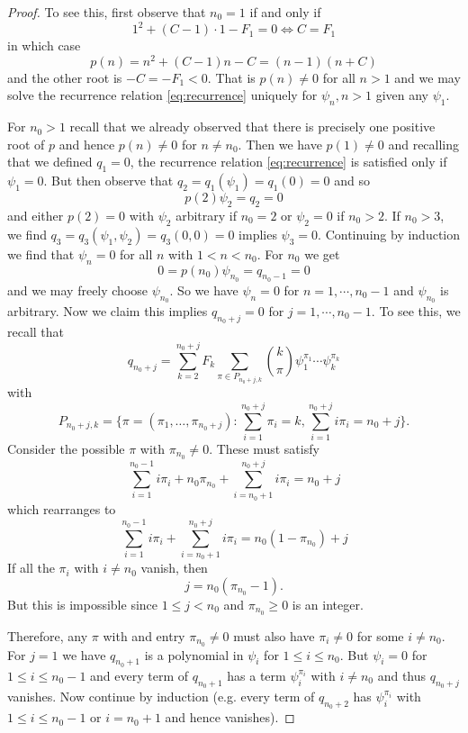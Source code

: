 \documentclass{amsart}
\begin{document}
\begin{proof}
To see this, first observe that \(n_0 = 1\) if and only if
\[
1^2 + (C - 1) \cdot 1 - F_1 = 0 \Leftrightarrow C = F_1
\]
in which case
\[
p(n) = n^2 + (C - 1) n - C = (n-1)(n + C)
\]
and the other root is \(-C = -F_1 < 0\). That is \(p(n) \ne 0\) for all \(n > 1\) and we may solve the recurrence relation \eqref{eq:recurrence} uniquely for \(\psi_n, n > 1\) given any \(\psi_1\).

For \(n_0 > 1\) recall that we already observed that there is precisely one positive root of \(p\) and hence \(p(n) \ne 0\) for \(n \ne n_0\). Then we have \(p(1) \ne 0\) and recalling that we defined \(q_1 = 0\), the recurrence relation \eqref{eq:recurrence} is satisfied only if \(\psi_1 = 0\). But then observe that \(q_2 = q_1(\psi_1) = q_1(0) = 0\) and so
\[
p(2) \psi_2 = q_2 = 0
\]
and either \(p(2) = 0\) with \(\psi_2\) arbitrary if \(n_0 = 2\) or \(\psi_2 = 0\) if \(n_0 > 2\). If \(n_0 > 3\), we find \(q_3 = q_3(\psi_1, \psi_2) = q_3(0, 0) = 0\) implies \(\psi_3 = 0\). Continuing by induction we find that \(\psi_n = 0\) for all \(n\) with \(1 < n < n_0\). For \(n_0\) we get
\[
0 = p(n_0) \psi_{n_0} = q_{n_0-1} = 0
\]
and we may freely choose \(\psi_{n_0}\). So we have \(\psi_n = 0\) for \(n = 1, \cdots, n_0 - 1\) and \(\psi_{n_0}\) is arbitrary. Now we claim this implies \(q_{n_0 + j} = 0\) for \(j = 1, \cdots, n_0 - 1\). To see this, we recall that
\[
q_{n_0 + j} = \sum_{k=2}^{n_0 + j} F_k \sum_{\pi \in P_{n_0+j,k}} {k \choose \pi} \psi_1^{\pi_1} \cdots \psi_k^{\pi_k}
\]
with
\[
P_{n_0 + j,k} = \{\pi = (\pi_1, \dots, \pi_{n_0 + j}) : \sum_{i=1}^{n_0+j} \pi_i = k, \sum_{i=1}^{n_0+j} i \pi_i = n_0 + j\}.
\]
Consider the possible \(\pi\) with \(\pi_{n_0} \ne 0\). These must satisfy
\[
\sum_{i=1}^{n_0-1} i \pi_i + n_0 \pi_{n_0} + \sum_{i=n_0+1}^{n_0 + j} i\pi_i = n_0 + j
\]
which rearranges to
\[
\sum_{i=1}^{n_0-1} i \pi_i + \sum_{i=n_0+1}^{n_0 + j} i\pi_i = n_0(1 - \pi_{n_0}) + j
\]
If all the \(\pi_i\) with \(i \ne n_0\) vanish, then
\[
j = n_0(\pi_{n_0} - 1).
\]
But this is impossible since \(1 \leq j < n_0\) and \(\pi_{n_0} \geq 0\) is an integer.

Therefore, any \(\pi\) with and entry \(\pi_{n_0} \ne 0\) must also have \(\pi_i \ne 0\) for some \(i \ne n_0\). For \(j = 1\) we have \(q_{n_0 + 1}\) is a polynomial in \(\psi_i\) for \(1 \leq i \leq n_0\). But \(\psi_i = 0\) for \(1 \leq i \leq n_0 -1\) and every term of \(q_{n_0 + 1}\) has a term \(\psi_i^{\pi_i}\) with \(i \ne n_0\) and thus \(q_{n_0 + j}\) vanishes. Now continue by induction (e.g. every term of \(q_{n_0 + 2}\) has \(\psi_i^{\pi_i}\) with \(1 \leq i \leq n_0 - 1\) or \(i = n_0 + 1\) and hence vanishes).


\end{proof}
\end{document}

